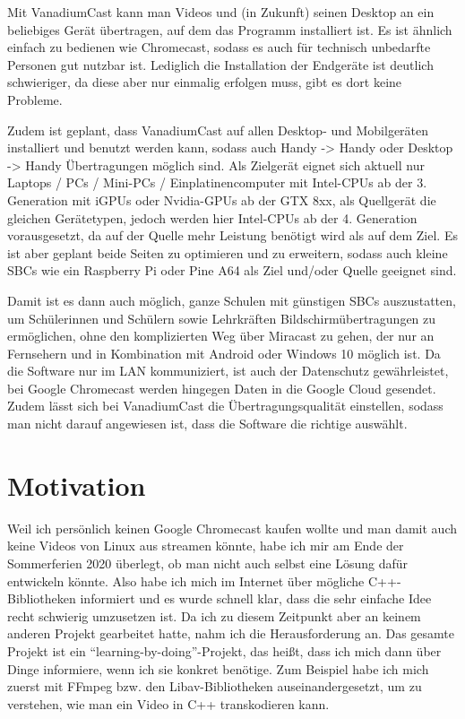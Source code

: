\documentclass{article}
\begin{document}
    Mit VanadiumCast kann man Videos und (in Zukunft) seinen Desktop an ein
    beliebiges Gerät übertragen, auf dem das Programm installiert ist. Es
    ist ähnlich einfach zu bedienen wie Chromecast, sodass es auch für
    technisch unbedarfte Personen gut nutzbar ist. Lediglich die Installation
    der Endgeräte ist deutlich schwieriger, da diese aber nur einmalig
    erfolgen muss, gibt es dort keine Probleme.

    Zudem ist geplant, dass VanadiumCast auf allen Desktop- und Mobilgeräten
    installiert und benutzt werden kann, sodass auch Handy -> Handy oder
    Desktop -> Handy Übertragungen möglich sind. Als Zielgerät eignet sich
    aktuell nur Laptops / PCs / Mini-PCs / Einplatinencomputer mit Intel-CPUs ab
    der 3. Generation mit iGPUs oder Nvidia-GPUs ab der GTX 8xx, als Quellgerät die
    gleichen Gerätetypen, jedoch werden hier Intel-CPUs ab der 4. Generation
    vorausgesetzt, da auf der Quelle mehr Leistung benötigt wird als auf dem
    Ziel. Es ist aber geplant beide Seiten zu optimieren und zu erweitern,
    sodass auch kleine SBCs wie ein Raspberry Pi oder Pine A64 als Ziel
    und/oder Quelle geeignet sind.

    Damit ist es dann auch möglich, ganze Schulen mit günstigen SBCs
    auszustatten, um Schülerinnen und Schülern sowie Lehrkräften
    Bildschirmübertragungen zu ermöglichen, ohne den komplizierten Weg über
    Miracast zu gehen, der nur an Fernsehern und in Kombination mit Android
    oder Windows 10 möglich ist. Da die Software nur im LAN kommuniziert,
    ist auch der Datenschutz gewährleistet, bei Google Chromecast werden
    hingegen Daten in die Google Cloud gesendet. Zudem lässt sich bei
    VanadiumCast die Übertragungsqualität einstellen, sodass man nicht
    darauf angewiesen ist, dass die Software die richtige auswählt.


    \section{Motivation}\label{sec:motivation}

    Weil ich persönlich keinen Google Chromecast kaufen wollte und man damit
    auch keine Videos von Linux aus streamen könnte, habe ich mir am Ende
    der Sommerferien 2020 überlegt, ob man nicht auch selbst eine Lösung
    dafür entwickeln könnte. Also habe ich mich im Internet über mögliche
    C++-Bibliotheken informiert und es wurde schnell klar, dass die sehr
    einfache Idee recht schwierig umzusetzen ist. Da ich zu diesem Zeitpunkt
    aber an keinem anderen Projekt gearbeitet hatte, nahm ich die
    Herausforderung an. Das gesamte Projekt ist ein
    ``learning-by-doing''-Projekt, das heißt, dass ich mich dann über Dinge
    informiere, wenn ich sie konkret benötige. Zum Beispiel habe ich mich
    zuerst mit FFmpeg bzw. den Libav-Bibliotheken auseinandergesetzt, um zu
    verstehen, wie man ein Video in C++ transkodieren kann.
\end{document}
